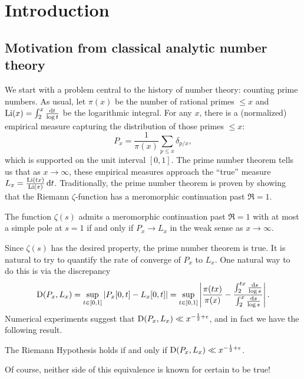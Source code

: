 
\chapter{Introduction}





\section{Motivation from classical analytic number theory}

We start with a problem central to the history of number theory: counting 
prime numbers. As usual, let $\pi(x)$ be the number of rational primes 
$\leqslant x$ and $\operatorname{Li}(x) = \int_2^x \frac{\mathrm{d} t}{\log t}$ be the 
logarithmic integral. For any $x$, there is a (normalized) empirical measure 
capturing the distribution of those primes $\leqslant x$: 
\[
	P_x = \frac{1}{\pi(x)} \sum_{p\leqslant x} \delta_{p/x} ,
\]
which is supported on the unit interval $[0,1]$. The prime number theorem 
tells us that as $x\to \infty$, these empirical measures approach the 
``true'' measure $L_x = \frac{\operatorname{Li}(t x)}{\operatorname{Li}(x)}\, \mathrm{d} t$. Traditionally, the 
prime number theorem is proven by showing that the Riemann $\zeta$-function 
has a meromorphic continuation past $\Re =1$. 

\begin{theorem}
The function $\zeta(s)$ admits a meromorphic continuation past $\Re =1$ with 
at most a simple pole at $s=1$ if and only if $P_x \to L_x$ in the weak sense 
as $x\to \infty$. 
\end{theorem}

Since $\zeta(s)$ has the desired property, the prime number theorem is true. 
It is natural to try to quantify the rate of converge of $P_x$ to $L_x$. One 
natural way to do this is via the discrepancy 
\[
	\operatorname{D}(P_x,L_x) 
		= \sup_{t\in [0,1]} \left| P_x[0,t] - L_x[0,t]\right|
		= \sup_{t\in [0,1]} \left| \frac{\pi(t x)}{\pi(x)} - \frac{\int_2^{tx} \frac{\mathrm{d} s}{\log s}}{\int_2^x \frac{\mathrm{d} s}{\log s}}\right| .
\]
Numerical experiments suggest that 
$\operatorname{D}(P_x,L_x) \ll x^{-\frac 1 2+\epsilon}$, and in fact we have the following 
result. 

\begin{theorem}
The Riemann Hypothesis holds if and only if 
$\operatorname{D}(P_x,L_x) \ll x^{-\frac 1 2+\epsilon}$. 
\end{theorem}

Of course, neither side of this equivalence is known for certain to be true! 

